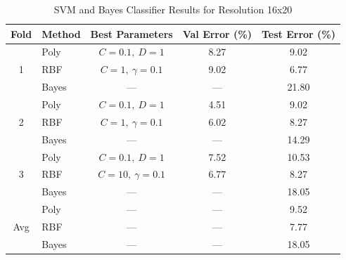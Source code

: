 \documentclass[12pt, letterpaper]{article}
\begin{document}
\begin{table}[htbp]
	\centering
	\caption{SVM and Bayes Classifier Results for Resolution 16x20}
	\begin{tabular}{clccc}
		\toprule
		\textbf{Fold} & \textbf{Method} & \textbf{Best Parameters} & \textbf{Val Error (\%)} & \textbf{Test Error (\%)} \\
		\midrule
		\multirow{3}{*}{1}
		              & Poly            & $C=0.1,\ D=1$            & 8.27                    & 9.02                     \\
		              & RBF             & $C=1,\ \gamma=0.1$       & 9.02                    & 6.77                     \\
		              & Bayes           & ---                      & ---                     & 21.80                    \\
		\midrule
		\multirow{3}{*}{2}
		              & Poly            & $C=0.1,\ D=1$            & 4.51                    & 9.02                     \\
		              & RBF             & $C=1,\ \gamma=0.1$       & 6.02                    & 8.27                     \\
		              & Bayes           & ---                      & ---                     & 14.29                    \\
		\midrule
		\multirow{3}{*}{3}
		              & Poly            & $C=0.1,\ D=1$            & 7.52                    & 10.53                    \\
		              & RBF             & $C=10,\ \gamma=0.1$      & 6.77                    & 8.27                     \\
		              & Bayes           & ---                      & ---                     & 18.05                    \\
		\midrule
		\multirow{3}{*}{Avg}
		              & Poly            & ---                      & ---                     & 9.52                     \\
		              & RBF             & ---                      & ---                     & 7.77                     \\
		              & Bayes           & ---                      & ---                     & 18.05                    \\
		\bottomrule
	\end{tabular}
	\label{tab:svm_bayes_16x20}
\end{table}
\end{document}
